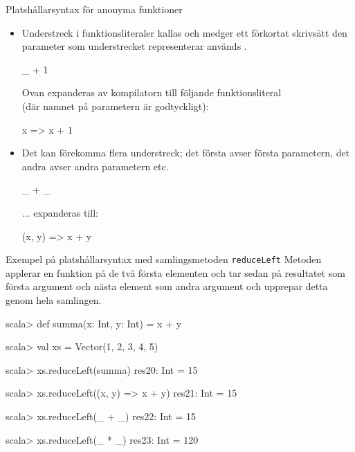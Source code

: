 \begin{Slide}{Platshållarsyntax för anonyma funktioner}\SlideFontSmall
\begin{itemize}
\item Understreck i funktionsliteraler kallas   och medger ett förkortat skrivsätt  den parameter som understrecket representerar används .

\begin{Code}[basicstyle=\ttfamily\fontsize{10}{12}\selectfont]
_ + 1
\end{Code}
Ovan expanderas av kompilatorn till följande funktionsliteral \\(där namnet på parametern är godtyckligt):
\begin{Code}[basicstyle=\ttfamily\fontsize{10}{12}\selectfont]
x => x + 1
\end{Code}
\pause
\item Det kan förekomma flera understreck; det första avser första parametern, det andra avser andra parametern etc.
\begin{Code}[basicstyle=\ttfamily\fontsize{10}{12}\selectfont]
_ + _
\end{Code}
... expanderas till:
\begin{Code}[basicstyle=\ttfamily\fontsize{10}{12}\selectfont]
(x, y) => x + y 
\end{Code}

\end{itemize}
\end{Slide} 


\begin{Slide}{Exempel på platshållarsyntax med samlingsmetoden \texttt{reduceLeft}}\SlideFontSmall
Metoden  applerar en funktion på de två första elementen och tar sedan på resultatet som första argument och nästa element som andra argument och upprepar detta genom hela samlingen. 
\begin{REPL}
scala> def summa(x: Int, y: Int) = x + y

scala> val xs = Vector(1, 2, 3, 4, 5)

scala> xs.reduceLeft(summa)
res20: Int = 15

scala> xs.reduceLeft((x, y) => x + y)
res21: Int = 15

scala> xs.reduceLeft(_ + _)
res22: Int = 15

scala> xs.reduceLeft(_ * _)
res23: Int = 120
\end{REPL}
\end{Slide} 


